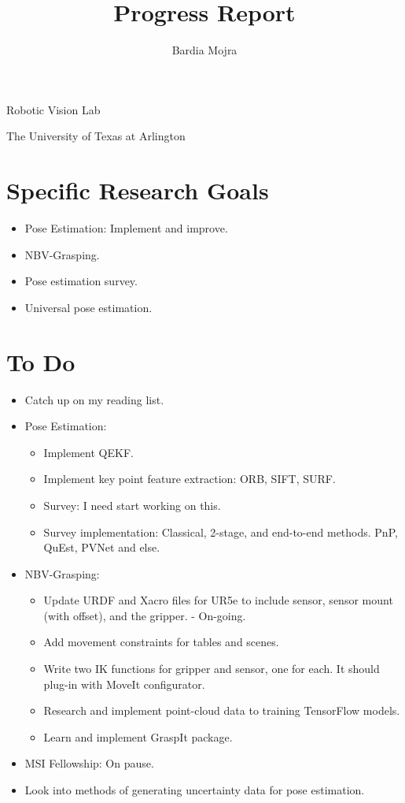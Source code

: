 \documentclass[11pt]{article}
\title{Progress Report}
\author{Bardia Mojra}
\begin{document}
\maketitle
\thispagestyle{empty}

\bigskip
\bigskip
\begin{center}
      Robotic Vision Lab
\end{center}

\begin{center}
      The University of Texas at Arlington
\end{center}

\newpage

\section{Specific Research Goals}
\begin{itemize}
      \item Pose Estimation: Implement and improve.
      \item NBV-Grasping.
      \item Pose estimation survey.
      \item Universal pose estimation.
\end{itemize}

\section{To Do}
\begin{itemize}
  \item Catch up on my reading list.
  \item Pose Estimation:
  \begin{itemize}
      \item Implement QEKF.
      \item Implement key point feature extraction: ORB, SIFT, SURF.
      \item Survey: I need start working on this.
      \item Survey implementation: Classical, 2-stage, and end-to-end methods. PnP, QuEst, PVNet and else.
  \end{itemize}
  \item NBV-Grasping:
      \begin{itemize}
      \item Update URDF and Xacro files for UR5e to include sensor,
sensor mount (with offset), and the gripper. - On-going.
      \item Add movement constraints for tables and scenes.
      \item Write two IK functions for gripper and sensor, one for each. It should plug-in with MoveIt configurator.
      \item Research and implement point-cloud data to training TensorFlow models.
      \item Learn and implement GraspIt package.
      \end{itemize}

  \item MSI Fellowship: On pause.
  \item Look into methods of generating uncertainty data for pose estimation.
\end{itemize}
\end{document}
